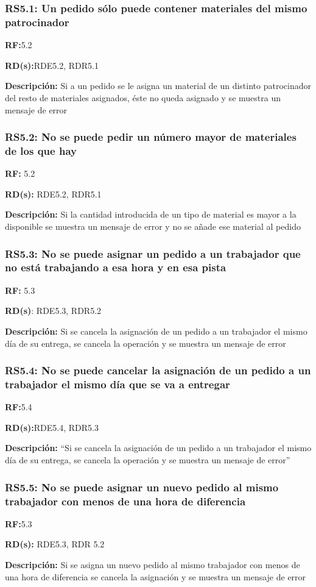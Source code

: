 \subsubsection{RS5.1: Un pedido sólo puede contener materiales del mismo patrocinador}
\textbf{RF:}5.2

\textbf{RD(s):}RDE5.2, RDR5.1

\textbf{Descripción: }Si a un pedido se le asigna un material de un distinto patrocinador del resto de materiales asignados, éste no queda asignado y se muestra un mensaje de error

\subsubsection{RS5.2: No se puede pedir un número  mayor de materiales de los que hay}
\textbf{RF:} 5.2

\textbf{RD(s): }RDE5.2, RDR5.1

\textbf{Descripción: }Si la cantidad introducida de un tipo de material es mayor a la disponible se muestra un mensaje de error y no se añade ese material al pedido

\subsubsection{RS5.3: No se puede asignar un pedido a un trabajador que no está trabajando a esa hora y en esa pista}
\textbf{RF:} 5.3

\textbf{RD(s)}: RDE5.3, RDR5.2

\textbf{Descripción:} Si se cancela la asignación de un pedido a un trabajador el mismo día de su entrega, se cancela la operación y se muestra un mensaje de error

\subsubsection{RS5.4: No se puede cancelar la asignación de un pedido a un trabajador el mismo día que se va a entregar}
\textbf{RF:}5.4

\textbf{RD(s):}RDE5.4, RDR5.3

\textbf{Descripción:} ``Si se cancela la asignación de un pedido a un trabajador el mismo día de su entrega, se cancela la operación y se muestra un mensaje de error''

\subsubsection{RS5.5: No se puede asignar un nuevo pedido al mismo trabajador con menos de una hora de diferencia}
\textbf{RF:}5.3

\textbf{RD(s):} RDE5.3, RDR 5.2

\textbf{Descripción:} Si se asigna un nuevo pedido al mismo trabajador con menos de una hora de diferencia se cancela la asignación y se muestra un mensaje de error

